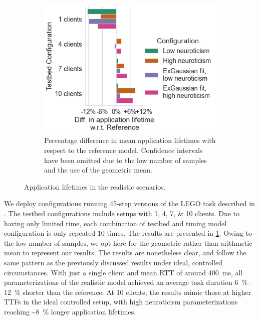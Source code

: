 \begin{figure}
\begin{subfigure}[]{\columnwidth}
        \includegraphics[width=\textwidth]{figs/new_model/lifetime_testbed_diff.png}
        \caption{%
            Percentage difference in mean application lifetimes with respect to the reference model.
            Confidence intervals have been omitted due to the low number of samples and the use of the geometric mean.
        }
    \end{subfigure}
    \caption{Application lifetimes in the realistic scenarios.}\label{fig:testbed_lifetimes}
\end{figure}

We deploy configurations running \num{45}-step versions of the LEGO task described in \textcite{olguinmunoz:impact2021}.
The testbed configurations include setups with \numlist{1;4;7;10} clients.
Due to having only limited time, each combination of testbed and timing model configuration is only repeated \num{10} times.
The results are presented in \cref{fig:testbed_lifetimes}.
Owing to the low number of samples, we opt here for the geometric rather than arithmetic mean to represent our results.
The results are nonetheless clear, and follow the same pattern as the previously discussed results under ideal, controlled circumstances.
With just a single client and mean \ac{RTT} of around \SI{400}{\milli\second}, all parameterizations of the realistic model achieved an average task duration \SIrange{6}{12}{\percent} shorter than the reference.
At \num{10} clients, the results mimic those at higher \acp{TTF} in the ideal controlled setup, with high neuroticism parameterizations reaching \textasciitilde\SI{8}{\percent} longer application lifetimes.

